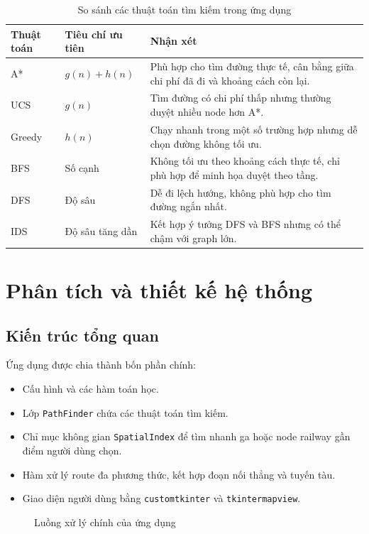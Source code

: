 \documentclass[12pt,a4paper]{article}
\begin{document}
\begin{table}[h]
\centering
\caption{So sánh các thuật toán tìm kiếm trong ứng dụng}
\label{tab:algorithms}
\begin{tabular}{p{3cm}p{4cm}p{6cm}}
\toprule
\textbf{Thuật toán} & \textbf{Tiêu chí ưu tiên} & \textbf{Nhận xét} \\
\midrule
A* & $g(n)+h(n)$ & Phù hợp cho tìm đường thực tế, cân bằng giữa chi phí đã đi và khoảng cách còn lại. \\
UCS & $g(n)$ & Tìm đường có chi phí thấp nhưng thường duyệt nhiều node hơn A*. \\
Greedy & $h(n)$ & Chạy nhanh trong một số trường hợp nhưng dễ chọn đường không tối ưu. \\
BFS & Số cạnh & Không tối ưu theo khoảng cách thực tế, chỉ phù hợp để minh họa duyệt theo tầng. \\
DFS & Độ sâu & Dễ đi lệch hướng, không phù hợp cho tìm đường ngắn nhất. \\
IDS & Độ sâu tăng dần & Kết hợp ý tưởng DFS và BFS nhưng có thể chậm với graph lớn. \\
\bottomrule
\end{tabular}
\end{table}

\section{Phân tích và thiết kế hệ thống}

\subsection{Kiến trúc tổng quan}

Ứng dụng được chia thành bốn phần chính:

\begin{itemize}
    \item Cấu hình và các hàm toán học.
    \item Lớp \texttt{PathFinder} chứa các thuật toán tìm kiếm.
    \item Chỉ mục không gian \texttt{SpatialIndex} để tìm nhanh ga hoặc node railway gần điểm người dùng chọn.
    \item Hàm xử lý route đa phương thức, kết hợp đoạn nối thẳng và tuyến tàu.
    \item Giao diện người dùng bằng \texttt{customtkinter} và \texttt{tkintermapview}.
\end{itemize}

\begin{figure}[h]
\centering
{}
\caption{Luồng xử lý chính của ứng dụng}
\label{fig:pipeline}
\end{figure}
\end{document}
